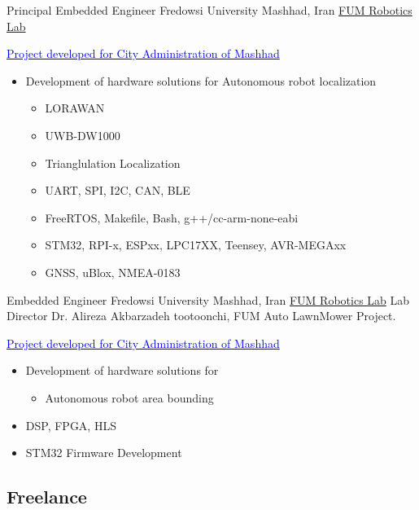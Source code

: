     {Principal Embedded Engineer}
    {Fredowsi University}
    {Mashhad, Iran}
    {
    \newline
    \href{https://www.fumrobotics.ir/people/}{\color{blue}FUM Robotics Lab}
    }
    {
    \href{https://drive.google.com/file/d/18mR13rZAn1kt_DuWFklTObaAwn6ODe9N/view?usp=sharing}{\textcolor{blue}{Project developed for City Administration of Mashhad}}
    \begin{itemize}
    \item Development of hardware solutions for Autonomous robot localization \begin{itemize}
            \item  LORAWAN
            \item UWB-DW1000
            \item Trianglulation Localization
            \item UART, SPI, I2C, CAN, BLE
            \item FreeRTOS,  Makefile, Bash, g++/cc-arm-none-eabi
            \item STM32, RPI-x, ESPxx, LPC17XX, Teensey, AVR-MEGAxx 
            \item GNSS, uBlox, NMEA-0183
        \end{itemize}
    \end{itemize}
    }
    {Embedded Engineer}
    {Fredowsi University}
    {Mashhad, Iran}
    {
    \newline
    \href{https://www.fumrobotics.ir/people/}{\color{blue}FUM Robotics Lab}
Lab Director Dr. Alireza Akbarzadeh tootoonchi, FUM Auto LawnMower Project. 
    }
    {
    \href{https://drive.google.com/file/d/18mR13rZAn1kt_DuWFklTObaAwn6ODe9N/view?usp=sharing}{\textcolor{blue}{Project developed for City Administration of Mashhad}}
    \begin{itemize}
    \item Development of hardware solutions for \begin{itemize}
            \item  Autonomous robot area bounding
        \end{itemize}
    \item DSP, FPGA, HLS
    \item STM32 Firmware Development
    \end{itemize}
    }


\vspace{2mm}

\subsection{\Large{{Freelance}}}

